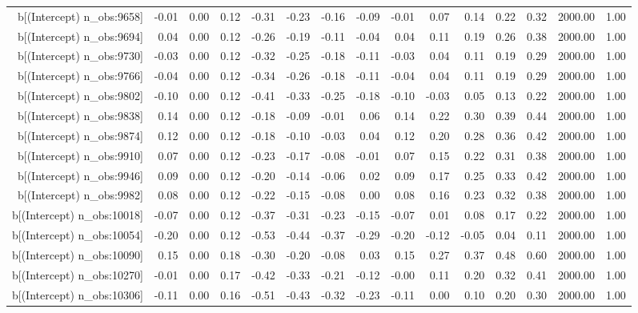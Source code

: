 \begin{table}[ht]
\begin{tabular}{rrrrrrrrrrrrrrr}
  b[(Intercept) n\_obs:9658] & -0.01 & 0.00 & 0.12 & -0.31 & -0.23 & -0.16 & -0.09 & -0.01 & 0.07 & 0.14 & 0.22 & 0.32 & 2000.00 & 1.00 \\ 
  b[(Intercept) n\_obs:9694] & 0.04 & 0.00 & 0.12 & -0.26 & -0.19 & -0.11 & -0.04 & 0.04 & 0.11 & 0.19 & 0.26 & 0.38 & 2000.00 & 1.00 \\ 
  b[(Intercept) n\_obs:9730] & -0.03 & 0.00 & 0.12 & -0.32 & -0.25 & -0.18 & -0.11 & -0.03 & 0.04 & 0.11 & 0.19 & 0.29 & 2000.00 & 1.00 \\ 
  b[(Intercept) n\_obs:9766] & -0.04 & 0.00 & 0.12 & -0.34 & -0.26 & -0.18 & -0.11 & -0.04 & 0.04 & 0.11 & 0.19 & 0.29 & 2000.00 & 1.00 \\ 
  b[(Intercept) n\_obs:9802] & -0.10 & 0.00 & 0.12 & -0.41 & -0.33 & -0.25 & -0.18 & -0.10 & -0.03 & 0.05 & 0.13 & 0.22 & 2000.00 & 1.00 \\ 
  b[(Intercept) n\_obs:9838] & 0.14 & 0.00 & 0.12 & -0.18 & -0.09 & -0.01 & 0.06 & 0.14 & 0.22 & 0.30 & 0.39 & 0.44 & 2000.00 & 1.00 \\ 
  b[(Intercept) n\_obs:9874] & 0.12 & 0.00 & 0.12 & -0.18 & -0.10 & -0.03 & 0.04 & 0.12 & 0.20 & 0.28 & 0.36 & 0.42 & 2000.00 & 1.00 \\ 
  b[(Intercept) n\_obs:9910] & 0.07 & 0.00 & 0.12 & -0.23 & -0.17 & -0.08 & -0.01 & 0.07 & 0.15 & 0.22 & 0.31 & 0.38 & 2000.00 & 1.00 \\ 
  b[(Intercept) n\_obs:9946] & 0.09 & 0.00 & 0.12 & -0.20 & -0.14 & -0.06 & 0.02 & 0.09 & 0.17 & 0.25 & 0.33 & 0.42 & 2000.00 & 1.00 \\ 
  b[(Intercept) n\_obs:9982] & 0.08 & 0.00 & 0.12 & -0.22 & -0.15 & -0.08 & 0.00 & 0.08 & 0.16 & 0.23 & 0.32 & 0.38 & 2000.00 & 1.00 \\ 
  b[(Intercept) n\_obs:10018] & -0.07 & 0.00 & 0.12 & -0.37 & -0.31 & -0.23 & -0.15 & -0.07 & 0.01 & 0.08 & 0.17 & 0.22 & 2000.00 & 1.00 \\ 
  b[(Intercept) n\_obs:10054] & -0.20 & 0.00 & 0.12 & -0.53 & -0.44 & -0.37 & -0.29 & -0.20 & -0.12 & -0.05 & 0.04 & 0.11 & 2000.00 & 1.00 \\ 
  b[(Intercept) n\_obs:10090] & 0.15 & 0.00 & 0.18 & -0.30 & -0.20 & -0.08 & 0.03 & 0.15 & 0.27 & 0.37 & 0.48 & 0.60 & 2000.00 & 1.00 \\ 
  b[(Intercept) n\_obs:10270] & -0.01 & 0.00 & 0.17 & -0.42 & -0.33 & -0.21 & -0.12 & -0.00 & 0.11 & 0.20 & 0.32 & 0.41 & 2000.00 & 1.00 \\ 
  b[(Intercept) n\_obs:10306] & -0.11 & 0.00 & 0.16 & -0.51 & -0.43 & -0.32 & -0.23 & -0.11 & 0.00 & 0.10 & 0.20 & 0.30 & 2000.00 & 1.00 \\ 

\end{tabular}
\end{table}
